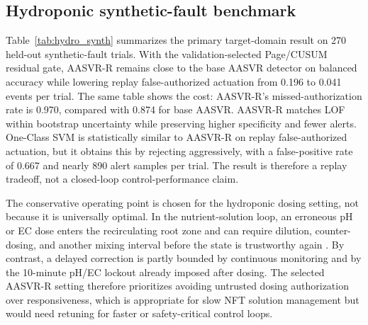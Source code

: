 \documentclass[preprint,12pt,doubleblind]{elsarticle}
\begin{document}
\begin{table}[t]
\centering
\caption{Hydroponic measurement streams used in the primary AASVR-R analysis. The table separates deployed sensing from quantitative use so that the water-level exclusion is explicit rather than hidden.}
\label{tab:hydro_streams}
\end{table}

\subsection{Hydroponic synthetic-fault benchmark}
Table~\ref{tab:hydro_synth} summarizes the primary target-domain result on 270 held-out synthetic-fault trials. With the validation-selected Page/CUSUM residual gate, AASVR-R remains close to the base AASVR detector on balanced accuracy while lowering replay false-authorized actuation from 0.196 to 0.041 events per trial. The same table shows the cost: AASVR-R's missed-authorization rate is 0.970, compared with 0.874 for base AASVR. AASVR-R matches LOF within bootstrap uncertainty while preserving higher specificity and fewer alerts. One-Class SVM is statistically similar to AASVR-R on replay false-authorized actuation, but it obtains this by rejecting aggressively, with a false-positive rate of 0.667 and nearly 890 alert samples per trial. The result is therefore a replay tradeoff, not a closed-loop control-performance claim.

The conservative operating point is chosen for the hydroponic dosing setting, not because it is universally optimal. In the nutrient-solution loop, an erroneous pH or EC dose enters the recirculating root zone and can require dilution, counter-dosing, and another mixing interval before the state is trustworthy again \cite{asaduzzaman2022nutrients,domingues2012automated}. By contrast, a delayed correction is partly bounded by continuous monitoring and by the 10-minute pH/EC lockout already imposed after dosing. The selected AASVR-R setting therefore prioritizes avoiding untrusted dosing authorization over responsiveness, which is appropriate for slow NFT solution management but would need retuning for faster or safety-critical control loops.
\end{document}
